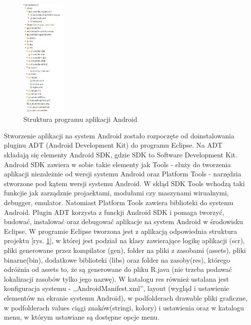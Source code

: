 \documentclass[eng,printmode,oneside]{mgr}
\begin{document}
\begin{figure}
\centering
\captionsetup{justification=centering,margin=1cm}
\vspace{-20pt}
\begin{center}
\includegraphics[width=0.2\textwidth]{struktura_android.png}
\end{center}
\vspace{-20pt}
  \caption{Struktura programu aplikacji Android}
\vspace{-10pt}
\label{android}
\end{figure}

Stworzenie aplikacji na system Android zostało rozpoczęte od doinstalowania
pluginu ADT (Android Development Kit) do programu Eclipse. Na ADT składają się
elementy Android SDK, gdzie SDK to Software Development Kit. Android SDK
zawiera w sobie takie elementy jak Tools - służy do tworzenia aplikacji niezależnie od
wersji systemu Android oraz Platform Tools - narzędzia stworzone pod kątem
wersji systemu Android. W skłąd SDK Tools wchodzą taki funkcjie jak zarządznie
projaektami, modułami czy maszynami wirualnymi, debugger, emulator. Natomiast
Platform Tools zawiera biblioteki do systemu Android. Plugin ADT  korzysta
z funckji Android SDK i pomaga tworzyć, budować, instalować oraz debugować
aplikacje na system Android w środowisku Eclipse. W programie Eclipse tworzona
jest z aplikacją odpowiednia struktura projektu [rys. \ref{android}], w której
jest podział na klasy zawierające logikę aplikacji (scr), pliki generowane przez kompilator (gen),
folder na pliki z zasobami (assets), pliki binarne(bin), dodatkowe biblioteki
(libs) oraz folder na zasoby(res), którego odróżnia od assets to, że są
generowane do pliku R.java (nie trzeba podawać lokalizacji zasobów tylko jego
nazwę). W katalogu res również ustalana jest konfiguracja systemu - 
,,AndroidManifest.xml'', layout (wygląd i ustawienie elementów na ekranie
systemu Android), w podfolderach drawable pliki graficzne, w podfolderach values
ciągi znaków(stringi, kolory) i ustawienia oraz w katalogu menu, w którym
ustawiane są dostępne opcje menu.
\end{document}
